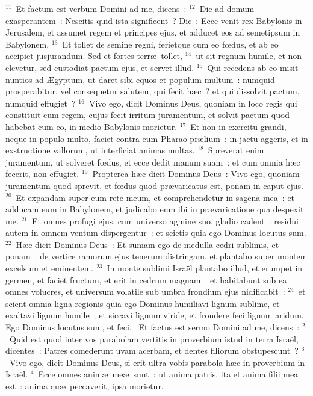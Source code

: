 ${}^{11}$~Et factum est verbum Domini ad me, dicens~:
${}^{12}$~Dic ad domum exasperantem~: Nescitis quid ista significent~? Dic~: Ecce venit rex Babylonis in Jerusalem, et assumet regem et principes ejus, et adducet eos ad semetipsum in Babylonem.
${}^{13}$~Et tollet de semine regni, ferietque cum eo fœdus, et ab eo accipiet jusjurandum. Sed et fortes terr\ae\ tollet,
${}^{14}$~ut sit regnum humile, et non elevetur, sed custodiat pactum ejus, et servet illud.
${}^{15}$~Qui recedens ab eo misit nuntios ad \AE gyptum, ut daret sibi equos et populum multum~: numquid prosperabitur, vel consequetur salutem, qui fecit h\ae c~? et qui dissolvit pactum, numquid effugiet~?
${}^{16}$~Vivo ego, dicit Dominus Deus, quoniam in loco regis qui constituit eum regem, cujus fecit irritum juramentum, et solvit pactum quod habebat cum eo, in medio Babylonis morietur.
${}^{17}$~Et non in exercitu grandi, neque in populo multo, faciet contra eum Pharao pr\ae lium~: in jactu aggeris, et in exstructione vallorum, ut interficiat animas multas.
${}^{18}$~Spreverat enim juramentum, ut solveret fœdus, et ecce dedit manum suam~: et cum omnia h\ae c fecerit, non effugiet.
${}^{19}$~Propterea h\ae c dicit Dominus Deus~: Vivo ego, quoniam juramentum quod sprevit, et fœdus quod pr\ae varicatus est, ponam in caput ejus.
${}^{20}$~Et expandam super eum rete meum, et comprehendetur in sagena mea~: et adducam eum in Babylonem, et judicabo eum ibi in pr\ae varicatione qua despexit me.
${}^{21}$~Et omnes profugi ejus, cum universo agmine suo, gladio cadent~: residui autem in omnem ventum dispergentur~: et scietis quia ego Dominus locutus sum.
${}^{22}$~H\ae c dicit Dominus Deus~: Et sumam ego de medulla cedri sublimis, et ponam~: de vertice ramorum ejus tenerum distringam, et plantabo super montem excelsum et eminentem.
${}^{23}$~In monte sublimi Isra\"el plantabo illud, et erumpet in germen, et faciet fructum, et erit in cedrum magnam~: et habitabunt sub ea omnes volucres, et universum volatile sub umbra frondium ejus nidificabit~:
${}^{24}$~et scient omnia ligna regionis quia ego Dominus humiliavi lignum sublime, et exaltavi lignum humile~; et siccavi lignum viride, et frondere feci lignum aridum. Ego Dominus locutus sum, et feci.
~Et factus est sermo Domini ad me, dicens~:
${}^{2}$~Quid est quod inter vos parabolam vertitis in proverbium istud in terra Isra\"el, dicentes~: Patres comederunt uvam acerbam, et dentes filiorum obstupescunt~?
${}^{3}$~Vivo ego, dicit Dominus Deus, si erit ultra vobis parabola h\ae c in proverbium in Isra\"el.
${}^{4}$~Ecce omnes anim\ae\ me\ae\ sunt~: ut anima patris, ita et anima filii mea est~: anima qu\ae\ peccaverit, ipsa morietur.
